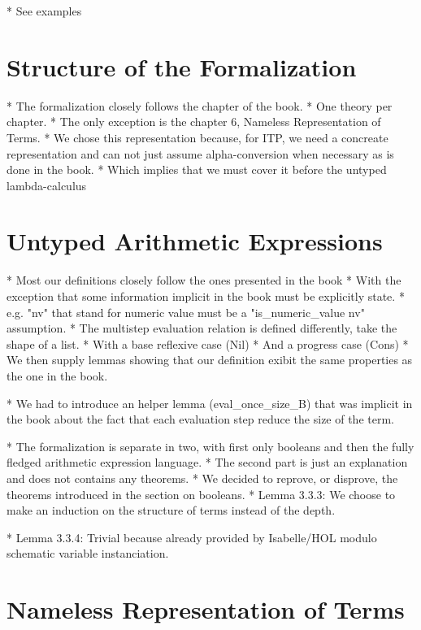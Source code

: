 \documentclass[a4paper, oneside, 12pt, titlepage]{article}
\begin{document}
  * See examples

\section{Structure of the Formalization}

  * The formalization closely follows the chapter of the book.
    * One theory per chapter.
    * The only exception is the chapter 6, Nameless Representation of Terms.
      * We chose this representation because, for ITP, we need a concreate representation and can
        not just assume alpha-conversion when necessary as is done in the book.
      * Which implies that we must cover it before the untyped lambda-calculus

\section{Untyped Arithmetic Expressions}

  * Most our definitions closely follow the ones presented in the book
    * With the exception that some information implicit in the book must be explicitly state.
      * e.g. "nv" that stand for numeric value must be a "is\_numeric\_value nv" assumption.
    * The multistep evaluation relation is defined differently, take the shape of a list.
      * With a base reflexive case (Nil)
      * And a progress case (Cons)
      * We then supply lemmas showing that our definition exibit the same properties as the one in
        the book.

  * We had to introduce an helper lemma (eval\_once\_size\_B) that was implicit in the book about the
    fact that each evaluation step reduce the size of the term.

  * The formalization is separate in two, with first only booleans and then the fully fledged
    arithmetic expression language.
    * The second part is just an explanation and does not contains any theorems.
      * We decided to reprove, or disprove, the theorems introduced in the section on booleans.
  * Lemma 3.3.3: We choose to make an induction on the structure of terms instead of the depth.

  * Lemma 3.3.4: Trivial because already provided by Isabelle/HOL modulo schematic variable
    instanciation.

\section{Nameless Representation of Terms}
\end{document}
